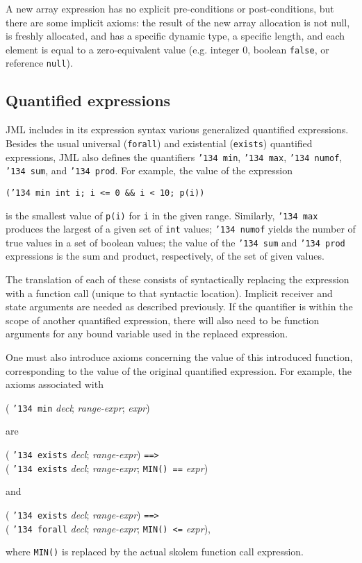 \documentclass{sig-alternate}
\begin{document}
A new array expression has no explicit pre-conditions or post-conditions, but there are some implicit axioms:
the result of the new array allocation is not null, is freshly allocated,
 and has a specific dynamic type, 
a specific length, and each
element is equal to a zero-equivalent value (e.g. integer 0, boolean \texttt{false}, or
reference \texttt{null}).

\subsection{Quantified expressions}

JML includes in its expression syntax various generalized quantified expressions.  Besides
the usual universal (\texttt{forall}) and existential (\texttt{exists}) quantified expressions, JML
also defines the quantifiers \texttt{\char'134 min}, \texttt{\char'134 max}, \texttt{\char'134 numof},
\texttt{\char'134 sum}, and \texttt{\char'134 prod}.  For example, the value of the expression
\begin{center} \texttt{(\char'134 min int i; i <= 0 \&\& i < 10; p(i))} \end{center}
is the smallest value of \texttt{p(i)} for \texttt{i} in the given range.  Similarly, \texttt{\char'134 max}
produces the largest of a given set of \texttt{int} values;  \texttt{\char'134 numof} yields the number
of true values in a set of boolean values; the value of the
 \texttt{\char'134 sum} and \texttt{\char'134 prod}
expressions is the sum and product, respectively, of the set of given values.

The translation of each of these consists of syntactically replacing the expression with a
function call (unique to that syntactic location).  Implicit receiver and state arguments are needed
as described previously.  If the quantifier is within the scope of another quantified
expression, there will also need to be function arguments for any bound variable used
in the replaced expression.

One must also introduce axioms concerning the value of this introduced function, 
corresponding to the value of the original quantified expression.  For example, the
axioms associated with
\begin{center} ( \texttt{\char'134 min} {\em decl}; {\em range-expr}; {\em expr}) \end{center}
are 
\begin{center} ( \texttt{\char'134 exists} {\em decl}; {\em range-expr}) \texttt{==>} \\
( \texttt{\char'134 exists} {\em decl}; {\em range-expr}; \texttt{MIN() ==} {\em expr}) \end{center}
and
\begin{center} ( \texttt{\char'134 exists} {\em decl}; {\em range-expr}) \texttt{==>} \\
( \texttt{\char'134 forall} {\em decl}; {\em range-expr}; \texttt{MIN() <=} {\em expr}), \end{center}
where \texttt{MIN()} is replaced by the actual skolem function call expression.
\end{document}
